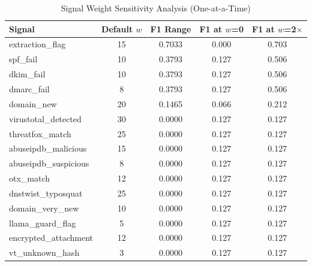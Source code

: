 \begin{table}[htbp]
\centering
\caption{Signal Weight Sensitivity Analysis (One-at-a-Time)}
\label{tab:weight-sensitivity}
\begin{tabular}{lcccc}
\toprule
Signal & Default $w$ & F1 Range & F1 at $w$=0 & F1 at $w$=2$\times$ \\
\midrule
  extraction\_flag & 15 & 0.7033 & 0.000 & 0.703 \\
  spf\_fail & 10 & 0.3793 & 0.127 & 0.506 \\
  dkim\_fail & 10 & 0.3793 & 0.127 & 0.506 \\
  dmarc\_fail & 8 & 0.3793 & 0.127 & 0.506 \\
  domain\_new & 20 & 0.1465 & 0.066 & 0.212 \\
  virustotal\_detected & 30 & 0.0000 & 0.127 & 0.127 \\
  threatfox\_match & 25 & 0.0000 & 0.127 & 0.127 \\
  abuseipdb\_malicious & 15 & 0.0000 & 0.127 & 0.127 \\
  abuseipdb\_suspicious & 8 & 0.0000 & 0.127 & 0.127 \\
  otx\_match & 12 & 0.0000 & 0.127 & 0.127 \\
  dnstwist\_typosquat & 25 & 0.0000 & 0.127 & 0.127 \\
  domain\_very\_new & 10 & 0.0000 & 0.127 & 0.127 \\
  llama\_guard\_flag & 5 & 0.0000 & 0.127 & 0.127 \\
  encrypted\_attachment & 12 & 0.0000 & 0.127 & 0.127 \\
  vt\_unknown\_hash & 3 & 0.0000 & 0.127 & 0.127 \\
\bottomrule
\end{tabular}
\end{table}